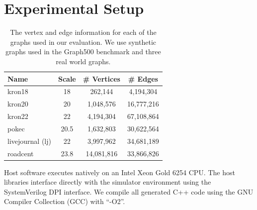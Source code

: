 %


\section{Experimental Setup}

\begin{table}[]
    \centering
    \begin{footnotesize}
    \begin{tabular}{lccc}
    \toprule
     \textbf{Name} & \textbf{Scale} & \textbf{\# Vertices} & \textbf{\# Edges} \\ \midrule %
     kron18 & 18 & 262,144 & 4,194,304 \\ %
     kron20 & 20 & 1,048,576 & 16,777,216 \\ %
     kron22 & 22 & 4,194,304 & 67,108,864 \\ %
     pokec & 20.5 & 1,632,803 & 30,622,564 \\ %
     livejournal (lj) & 22 & 3,997,962 & 34,681,189 \\ %
     roadcent & 23.8 & 14,081,816 & 33,866,826 \\
     \bottomrule
    \end{tabular}
    \end{footnotesize}
    \caption{The vertex and edge information for each of the graphs used in our evaluation. We use synthetic \kron graphs used in the Graph500 benchmark and three real world graphs.}
    \label{sec:eval:tab:graphs}
\end{table}

Host software executes natively on an Intel Xeon Gold 6254 CPU.
The host libraries interface directly with the simulator environment using the SystemVerilog DPI interface.
We compile all generated C++ code using the GNU Compiler Collection (GCC) with ``-O2''.

